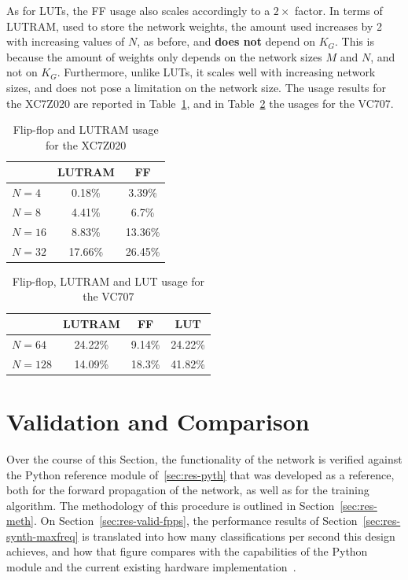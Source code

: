 As for LUTs, the FF usage also scales accordingly to a $2\times$ factor. In terms of LUTRAM, used to store the network weights,
the amount used increases by 2 with increasing values of $N$, as before, and \textbf{does not} depend on $K_G$. This is because
the amount of weights only depends on the network sizes $M$ and $N$, and not on $K_G$. Furthermore, unlike LUTs, it scales well
with increasing network sizes, and does not pose a limitation on the network size. The usage results for the XC7Z020 are reported in Table~\ref{tab:ff},
and in Table~\ref{tab:ff-virtx7} the usages for the VC707.

\begin{table}
    \centering
  \begin{tabular}{ | l | c | c |}
    \hline
         & LUTRAM  & FF  \\
    \hline
    $N=4$ & 0.18\%  & 3.39\% \\
    \hline
    $N=8$ & 4.41\%  & 6.7\% \\
    \hline
    $N=16$ & 8.83\%  & 13.36\% \\
    \hline
    $N=32$ & 17.66\% &  26.45\% \\
\hline
  \end{tabular}
  \caption{Flip-flop and LUTRAM usage for the XC7Z020}
	\label{tab:ff}
\end{table}


\begin{table}

    \centering
  \begin{tabular}{ | l | c | c | c |}
    \hline
         & LUTRAM  & FF & LUT \\
    \hline
    $N=64$ & 24.22\%  & 9.14\% & 24.22\% \\
    \hline
    $N=128$ & 14.09\%  & 18.3\% & 41.82\%\\
    \hline
  \end{tabular}
  \caption{Flip-flop, LUTRAM and LUT usage for the VC707}
  \label{tab:ff-virtx7}
\end{table}

\section{Validation and Comparison}\label{sec:res-valid}
Over the course of this Section, the functionality of the network is verified against the Python reference module of~\ref{sec:res-pyth} that was developed as a
reference, both for the forward propagation of the network, as well as for the training algorithm. The methodology of this procedure is outlined in Section~\ref{sec:res-meth}.
On Section~\ref{sec:res-valid-fpps}, the performance results of Section~\ref{sec:res-synth-maxfreq} is translated into how many classifications per second this design
achieves, and how that figure compares with the capabilities of the Python module and the current existing hardware implementation~\cite{Chang15}.

